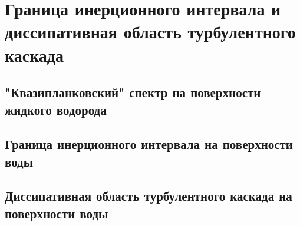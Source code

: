 \chapter{Граница инерционного интервала и диссипативная область турбулентного каскада} \label{chapt3}

\section{"Квазипланковский" спектр на поверхности жидкого водорода} \label{sect3_1}
\section{Граница инерционного интервала на поверхности воды} \label{sect3_2}
\section{Диссипативная область турбулентного каскада на поверхности воды} \label{sect3_3}


\clearpage

